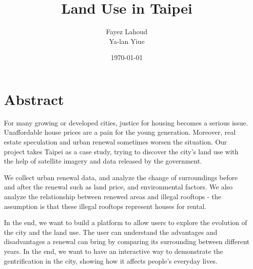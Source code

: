 \documentclass[12pt]{article}
\title{Land Use in Taipei}
\author{Fayez Lahoud \\ Ya-lan Yiue}
\date{\today}
\begin{document}
\maketitle

\section*{Abstract}
For many growing or developed cities, justice for housing becomes a serious issue. Unaffordable house prices are a pain for the young generation. Moreover, real estate speculation and urban renewal sometimes worsen the situation. Our project takes Taipei as a case study, trying to discover the city's land use with the help of satellite imagery and data released by the government.

We collect urban renewal data, and analyze the change of surroundings before and after the renewal such as land price, and environmental factors. We also analyze the relationship between renewed areas and illegal rooftops - the assumption is that these illegal rooftops represent houses for rental.

In the end, we want to build a platform to allow users to explore the evolution of the city and the land use. The user can understand the advantages and disadvantages a renewal can bring by comparing its surrounding between different years. In the end, we want to have an interactive way to demonstrate the gentrification in the city, showing how it affects people’s everyday lives.
\end{document}
